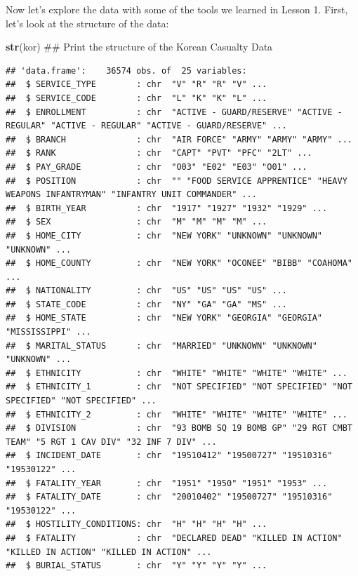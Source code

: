 \documentclass[]{book}
\newenvironment{Shaded}{\begin{snugshade}}{\end{snugshade}}
\newcommand{\KeywordTok}[1]{\textcolor[rgb]{0.13,0.29,0.53}{\textbf{{#1}}}}
\newcommand{\NormalTok}[1]{{#1}}
\begin{document}
Now let's explore the data with some of the tools we learned in Lesson
1. First, let's look at the structure of the data:

\begin{Shaded}
\begin{Highlighting}[]
\KeywordTok{str}\NormalTok{(kor)  ## Print the structure of the Korean Casualty Data}
\end{Highlighting}
\end{Shaded}

\begin{verbatim}
## 'data.frame':    36574 obs. of  25 variables:
##  $ SERVICE_TYPE        : chr  "V" "R" "R" "V" ...
##  $ SERVICE_CODE        : chr  "L" "K" "K" "L" ...
##  $ ENROLLMENT          : chr  "ACTIVE - GUARD/RESERVE" "ACTIVE - REGULAR" "ACTIVE - REGULAR" "ACTIVE - GUARD/RESERVE" ...
##  $ BRANCH              : chr  "AIR FORCE" "ARMY" "ARMY" "ARMY" ...
##  $ RANK                : chr  "CAPT" "PVT" "PFC" "2LT" ...
##  $ PAY_GRADE           : chr  "O03" "E02" "E03" "O01" ...
##  $ POSITION            : chr  "" "FOOD SERVICE APPRENTICE" "HEAVY WEAPONS INFANTRYMAN" "INFANTRY UNIT COMMANDER" ...
##  $ BIRTH_YEAR          : chr  "1917" "1927" "1932" "1929" ...
##  $ SEX                 : chr  "M" "M" "M" "M" ...
##  $ HOME_CITY           : chr  "NEW YORK" "UNKNOWN" "UNKNOWN" "UNKNOWN" ...
##  $ HOME_COUNTY         : chr  "NEW YORK" "OCONEE" "BIBB" "COAHOMA" ...
##  $ NATIONALITY         : chr  "US" "US" "US" "US" ...
##  $ STATE_CODE          : chr  "NY" "GA" "GA" "MS" ...
##  $ HOME_STATE          : chr  "NEW YORK" "GEORGIA" "GEORGIA" "MISSISSIPPI" ...
##  $ MARITAL_STATUS      : chr  "MARRIED" "UNKNOWN" "UNKNOWN" "UNKNOWN" ...
##  $ ETHNICITY           : chr  "WHITE" "WHITE" "WHITE" "WHITE" ...
##  $ ETHNICITY_1         : chr  "NOT SPECIFIED" "NOT SPECIFIED" "NOT SPECIFIED" "NOT SPECIFIED" ...
##  $ ETHNICITY_2         : chr  "WHITE" "WHITE" "WHITE" "WHITE" ...
##  $ DIVISION            : chr  "93 BOMB SQ 19 BOMB GP" "29 RGT CMBT TEAM" "5 RGT 1 CAV DIV" "32 INF 7 DIV" ...
##  $ INCIDENT_DATE       : chr  "19510412" "19500727" "19510316" "19530122" ...
##  $ FATALITY_YEAR       : chr  "1951" "1950" "1951" "1953" ...
##  $ FATALITY_DATE       : chr  "20010402" "19500727" "19510316" "19530122" ...
##  $ HOSTILITY_CONDITIONS: chr  "H" "H" "H" "H" ...
##  $ FATALITY            : chr  "DECLARED DEAD" "KILLED IN ACTION" "KILLED IN ACTION" "KILLED IN ACTION" ...
##  $ BURIAL_STATUS       : chr  "Y" "Y" "Y" "Y" ...
\end{verbatim}
\end{document}
